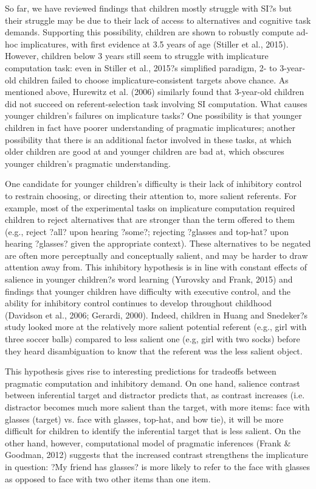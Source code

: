 So far, we have reviewed findings that children mostly struggle with SI?s but their struggle may be due to their lack of access to alternatives and cognitive task demands. Supporting this possibility, children are shown to robustly compute ad-hoc implicatures, with first evidence at 3.5 years of age (Stiller et al., 2015). However, children below 3 years still seem to struggle with implicature computation task: even in Stiller et al., 2015?s simplified paradigm, 2- to 3-year-old children failed to choose implicature-consistent targets above chance. As mentioned above, Hurewitz et al. (2006) similarly found that 3-year-old children did not succeed on referent-selection task involving SI computation. What causes younger children's failures on implicature tasks? One possibility is that younger children in fact have poorer understanding of pragmatic implicatures; another possibility that there is an additional factor involved in these tasks, at which older children are good at and younger children are bad at, which obscures younger children's pragmatic understanding. 

One candidate for younger children's difficulty is their lack of inhibitory control to restrain choosing, or directing their attention to, more salient referents. For example, most of the experimental tasks on implicature computation required children to reject alternatives that are stronger than the term offered to them (e.g., reject ?all? upon hearing ?some?; rejecting ?glasses and top-hat? upon hearing ?glasses? given the appropriate context). These alternatives to be negated are often more perceptually and conceptually salient, and may be harder to draw attention away from.  This inhibitory hypothesis is in line with constant effects of salience in younger children?s word learning (Yurovsky and Frank, 2015) and findings that younger children have difficulty with executive control, and the ability for inhibitory control continues to develop throughout childhood (Davidson et al., 2006; Gerardi, 2000). Indeed, children in Huang and Snedeker?s study looked more at the relatively more salient potential referent (e.g., girl with three soccer balls) compared to less salient one (e.g, girl with two socks) before they heard disambiguation to know that the referent was the less salient object. 

This hypothesis gives rise to interesting predictions for tradeoffs between pragmatic computation and inhibitory demand. On one hand, salience contrast between inferential target and distractor predicts that, as contrast increases (i.e. distractor becomes much more salient than the target, with more items: face with glasses (target) vs. face with glasses, top-hat, and bow tie), it will be more difficult for children to identify the inferential target that is less salient. On the other hand, however, computational model of pragmatic inferences (Frank & Goodman, 2012) suggests that the increased contrast strengthens the implicature in question: ?My friend has glasses? is more likely to refer to the face with glasses as opposed to face with two other items than one item.  

